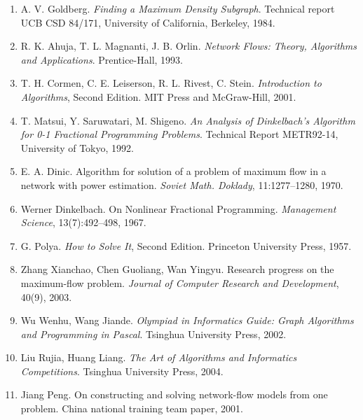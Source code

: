 \documentclass[11pt]{article}
\begin{document}
\begin{enumerate}
  \item A. V. Goldberg. \emph{Finding a Maximum Density Subgraph}. Technical
  report UCB CSD 84/171, University of California, Berkeley, 1984.
  \item R. K. Ahuja, T. L. Magnanti, J. B. Orlin. \emph{Network Flows:
  Theory, Algorithms and Applications}. Prentice-Hall, 1993.
  \item T. H. Cormen, C. E. Leiserson, R. L. Rivest, C. Stein.
  \emph{Introduction to Algorithms}, Second Edition. MIT Press and
  McGraw-Hill, 2001.
  \item T. Matsui, Y. Saruwatari, M. Shigeno. \emph{An Analysis of
  Dinkelbach's Algorithm for 0-1 Fractional Programming Problems}. Technical
  Report METR92-14, University of Tokyo, 1992.
  \item E. A. Dinic. Algorithm for solution of a problem of maximum flow in a
  network with power estimation. \emph{Soviet Math. Doklady}, 11:1277--1280,
  1970.
  \item Werner Dinkelbach. On Nonlinear Fractional Programming.
  \emph{Management Science}, 13(7):492--498, 1967.
  \item G. Polya. \emph{How to Solve It}, Second Edition. Princeton
  University Press, 1957.
  \item Zhang Xianchao, Chen Guoliang, Wan Yingyu. Research progress on the
  maximum-flow problem. \emph{Journal of Computer Research and Development},
  40(9), 2003.
  \item Wu Wenhu, Wang Jiande. \emph{Olympiad in Informatics Guide: Graph
  Algorithms and Programming in Pascal}. Tsinghua University Press, 2002.
  \item Liu Rujia, Huang Liang. \emph{The Art of Algorithms and Informatics
  Competitions}. Tsinghua University Press, 2004.
  \item Jiang Peng. On constructing and solving network-flow models from one
  problem. China national training team paper, 2001.
\end{enumerate}
\end{document}
